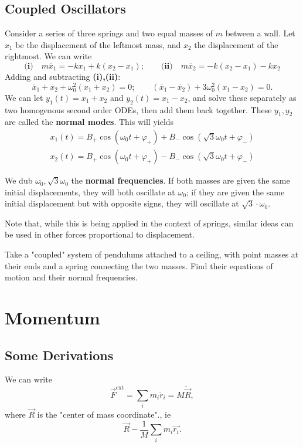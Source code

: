 \documentclass[12pt]{article}
\begin{document}
\subsection{Coupled Oscillators}
Consider a series of three springs and two equal masses of $m$ between a wall. Let $x_1$ be the displacement of the leftmost mass, and $x_2$ the displacement of the rightmost. We can write
\[\textbf{(i)}\quad m\ddot{x_1} = -kx_1 + k(x_2 -x_1);\qquad \textbf{(ii)}\quad m\ddot{x_2} = -k(x_2-x_1)-kx_2\]
Adding and subtracting \textbf{(i),(ii)}:
\[\ddot{x_1}+\ddot{x_2}+\omega_0^2(x_1+x_2)=0; \qquad (\ddot{x_1} - \ddot{x_2})+3 \omega_0^2 (x_1 - x_2) = 0.\] We can let $y_1(t) = x_1 + x_2$ and $y_2(t) = x_1 - x_2$, and solve these separately as two homogenous second order ODEs, then add them back together. These $y_1, y_2$ are called the \textbf{normal modes}. This will yields
\begin{align*}
  x_1(t) = B_+ \cos(\omega_0t + \varphi_+) + B_- \cos(\sqrt{3}\omega_0t + \varphi_-)\\
  x_2(t) = B_+ \cos(\omega_0t+\varphi_+) - B_- \cos(\sqrt{3} \omega_0 t + \varphi_-)
\end{align*}

We dub $\omega_0, \sqrt{3}\omega_0$ the \textbf{normal frequencies}. If both masses are given the same initial displacements, they will both oscillate at $\omega_0$; if they are given the same initial displacement but with opposite signs, they will oscillate at $\sqrt{3}\cdot\omega_0$.

Note that, while this is being applied in the context of springs, similar ideas can be used in other forces proportional to displacement.

\begin{example}
  Take a "coupled" system of pendulums attached to a ceiling, with point masses at their ends and a spring connecting the two masses. Find their equations of motion and their normal frequencies.
\end{example}


\section{Momentum}

\subsection{Some Derivations}

We can write \[\vec{F}^{\text{ext}} = \sum_i m_i \ddot{r}_i = M \ddot{\vec{R}},\] where $\vec{R}$ is the "center of mass coordinate"., ie \[\vec{R} - \frac{1}{M} \sum_i m_i \vec{r_i}.\]
\end{document}
